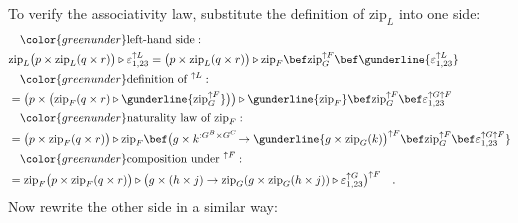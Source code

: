 To verify the associativity law, substitute the definition of $\text{zip}_{L}$
into one side:
\begin{align*}
 & \quad{\color{greenunder}\text{left-hand side}:}\quad\\
 & \text{zip}_{L}\big(p\times\text{zip}_{L}(q\times r)\big)\triangleright\varepsilon_{1,23}^{\uparrow L}=\big(p\times\text{zip}_{L}(q\times r)\big)\triangleright\text{zip}_{F}\bef\text{zip}_{G}^{\uparrow F}\bef\gunderline{\varepsilon_{1,23}^{\uparrow L}}\\
 & \quad{\color{greenunder}\text{definition of }^{\uparrow L}:}\quad\\
 & =\big(p\times\big(\text{zip}_{F}(q\times r)\triangleright\gunderline{\text{zip}_{G}^{\uparrow F}}\big)\big)\triangleright\gunderline{\text{zip}_{F}}\bef\text{zip}_{G}^{\uparrow F}\bef\varepsilon_{1,23}^{\uparrow G\uparrow F}\\
 & \quad{\color{greenunder}\text{naturality law of }\text{zip}_{F}:}\quad\\
 & =\big(p\times\text{zip}_{F}(q\times r)\big)\triangleright\text{zip}_{F}\bef\big(g\times k^{:G^{B}\times G^{C}}\!\rightarrow\gunderline{g\times\text{zip}_{G}(k)\big)^{\uparrow F}\bef\text{zip}_{G}^{\uparrow F}\bef\varepsilon_{1,23}^{\uparrow G\uparrow F}}\\
 & \quad{\color{greenunder}\text{composition under }^{\uparrow F}:}\quad\\
 & =\text{zip}_{F}\big(p\times\text{zip}_{F}(q\times r)\big)\triangleright\big(g\times(h\times j)\rightarrow\text{zip}_{G}(g\times\text{zip}_{G}(h\times j))\triangleright\varepsilon_{1,23}^{\uparrow G}\big)^{\uparrow F}\quad.
\end{align*}
Now rewrite the other side in a similar way:
